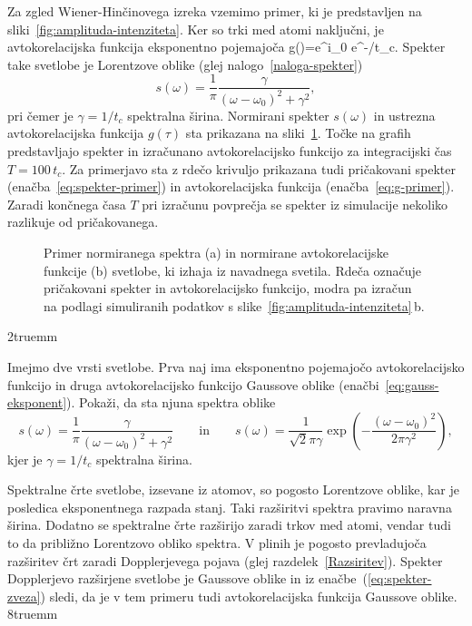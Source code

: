 Za zgled Wiener-Hinčinovega izreka vzemimo primer, ki je predstavljen na 
sliki~\ref{fig:amplituda-intenziteta}. 
Ker so trki med atomi naključni, je avtokorelacijska funkcija eksponentno pojemajoča
\beq
g(\tau)=e^{i\omega_{0}\tau} e^{-\tau/t_{c}}.
\label{eq:g-primer}
\eeq
Spekter take svetlobe je Lorentzove 
oblike (glej nalogo~\ref{naloga-spekter})
\begin{equation}
s(\omega)=\frac{1}{\pi}\frac{\gamma}{(\omega-\omega_{0})^{2}+\gamma^{2}},
\label{eq:spekter-primer}
\end{equation}
pri čemer je $\gamma=1/t_{c}$ spektralna širina. 
Normirani spekter $s(\omega)$ in ustrezna avtokorelacijska funkcija $g(\tau)$ 
sta prikazana na sliki~\ref{fig:SpekterAc}. 
Točke na grafih 
predstavljajo spekter in izračunano avtokorelacijsko funkcijo 
za integracijski čas $T=100\,t_{c}$. Za primerjavo sta z rdečo 
krivuljo prikazana tudi pričakovani spekter (enačba~\ref{eq:spekter-primer}) in avtokorelacijska
funkcija (enačba~\ref{eq:g-primer}). Zaradi končnega
časa $T$ pri izračunu povprečja se spekter iz simulacije nekoliko razlikuje
od pričakovanega. 
\begin{figure}[ht]
\centering
\def\svgwidth{128truemm} 

\caption{Primer normiranega spektra (a) in normirane avtokorelacijske funkcije (b) svetlobe, ki izhaja 
iz navadnega svetila. Rdeča označuje pričakovani spekter
in avtokorelacijsko funkcijo, modra pa izračun na podlagi simuliranih 
podatkov s slike~\ref{fig:amplituda-intenziteta}\,b.}
\label{fig:SpekterAc}
\end{figure}
\vglue2truemm
\begin{naloga}
\label{naloga-spekter}
Imejmo dve vrsti svetlobe. Prva naj ima eksponentno pojemajočo avtokorelacijsko funkcijo in druga
avtokorelacijsko funkcijo Gaussove oblike (enačbi~\ref{eq:gauss-eksponent}). Pokaži, da sta njuna
spektra oblike
\begin{equation}
s(\omega)=
\frac{1}{\pi}\frac{\gamma}{(\omega-\omega_{0})^{2}+\gamma^{2}} \qquad \mathrm{in} \qquad 
s(\omega)= \frac{1}{\sqrt{2}\pi\gamma}\exp\left(-
\frac{\left(\omega-\omega_{0}\right)^{2}}{2\pi\gamma^{2}}\right)\!\!,
\end{equation}
kjer je $\gamma=1/t_{c}$ spektralna širina. 
\end{naloga}

Spektralne črte svetlobe, izsevane iz atomov, so pogosto Lorentzove oblike, kar je posledica
eksponentnega razpada stanj. Taki razširitvi spektra pravimo naravna širina. Dodatno se spektralne
črte razširijo zaradi trkov med atomi, vendar tudi to da približno Lorentzovo
obliko spektra. V plinih je pogosto prevladujoča razširitev črt
zaradi Dopplerjevega pojava (glej razdelek~\ref{Razsiritev}). Spekter 
Dopplerjevo razširjene svetlobe je Gaussove oblike in iz enačbe~(\ref{eq:spekter-zveza})
sledi, da je v tem primeru tudi avtokorelacijska funkcija Gaussove oblike.
\vglue8truemm

